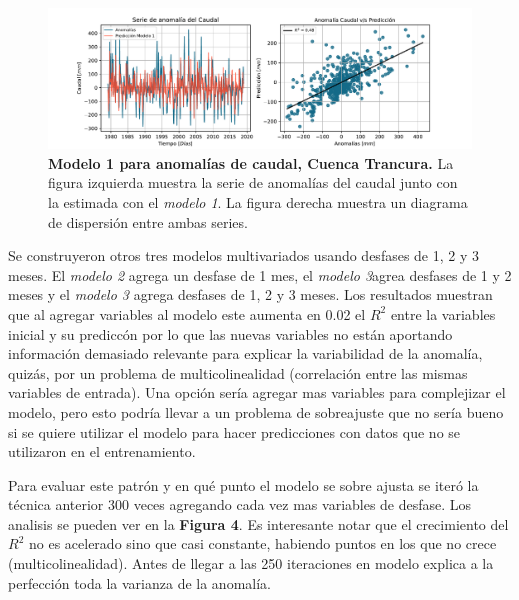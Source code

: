 \bigskip

\begin{figure}[htp!]
\centering
\includegraphics[width=1\textwidth]{img/model1.pdf}
\caption{\textbf{Modelo 1 para anomalías de caudal, Cuenca Trancura.} La figura izquierda muestra la serie de anomalías del caudal junto con la estimada con el \textit{modelo 1}. La figura derecha muestra un diagrama de dispersión entre ambas series.}
\label{fig:8}
\end{figure}

\bigskip

Se construyeron otros tres modelos multivariados usando desfases de 1, 2 y 3 meses. El \textit{modelo 2} agrega un desfase de 1 mes, el \textit{modelo 3}agrea desfases de 1 y 2 meses y el \textit{modelo 3} agrega desfases de 1, 2 y 3 meses. Los resultados muestran que al agregar variables al modelo este aumenta en 0.02  el $R^{2}$ entre la variables inicial y su prediccón por lo que las nuevas variables no están aportando información demasiado relevante para explicar la variabilidad de la anomalía, quizás, por un problema de multicolinealidad (correlación entre las mismas variables de entrada). Una opción sería agregar mas variables para complejizar el modelo, pero esto podría llevar a un problema de sobreajuste que no sería bueno si se quiere utilizar el modelo para hacer predicciones con datos que no se utilizaron en el entrenamiento.  

\bigskip

Para evaluar este patrón y en qué punto el modelo se sobre ajusta se iteró la técnica anterior 300 veces agregando cada vez mas variables de desfase. Los analisis se pueden ver en la \textbf{Figura 4}. Es interesante notar que el crecimiento del $R^{2}$ no es acelerado sino que casi constante, habiendo puntos en los que no crece (multicolinealidad). Antes de llegar a las 250 iteraciones en modelo explica a la perfección toda la varianza de la anomalía.

\newpage

\bigskip

